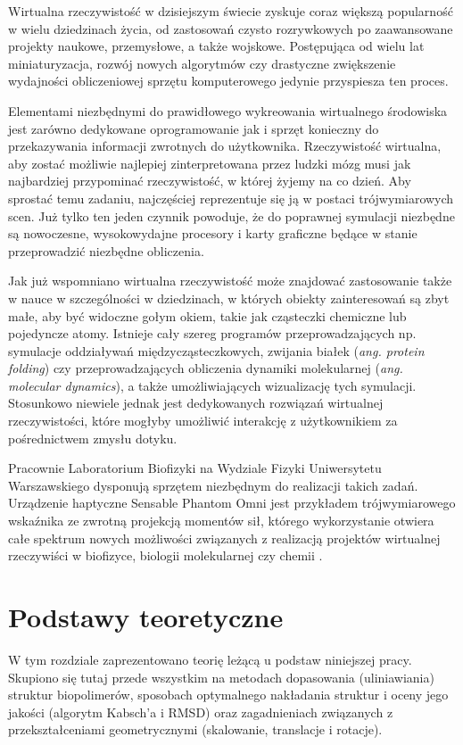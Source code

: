 \documentclass[licencjacka]{pracamgr}
\begin{document}
Wirtualna rzeczywistość w dzisiejszym świecie zyskuje coraz większą popularność w wielu dziedzinach życia, od zastosowań czysto rozrywkowych po zaawansowane projekty naukowe, przemysłowe, a także wojskowe. Postępująca od wielu lat miniaturyzacja, rozwój nowych algorytmów czy drastyczne zwiększenie wydajności obliczeniowej sprzętu komputerowego jedynie przyspiesza ten proces.

Elementami niezbędnymi do prawidłowego wykreowania wirtualnego środowiska jest zarówno dedykowane oprogramowanie jak i sprzęt konieczny do przekazywania informacji zwrotnych do użytkownika. Rzeczywistość wirtualna, aby zostać możliwie najlepiej zinterpretowana przez ludzki mózg musi jak najbardziej przypominać rzeczywistość, w której żyjemy na co dzień. Aby sprostać temu zadaniu, najczęściej reprezentuje się ją w postaci trójwymiarowych scen. Już tylko ten jeden czynnik powoduje, że do poprawnej symulacji niezbędne są nowoczesne, wysokowydajne procesory i karty graficzne będące w stanie przeprowadzić niezbędne obliczenia.

Jak już wspomniano wirtualna rzeczywistość może znajdować zastosowanie także w nauce w szczególności w dziedzinach, w których obiekty zainteresowań są zbyt małe, aby być widoczne gołym okiem, takie jak cząsteczki chemiczne lub pojedyncze atomy. Istnieje cały szereg programów przeprowadzających np. symulacje oddziaływań międzycząsteczkowych, zwijania białek (\textit{ang. protein folding}) czy przeprowadzających obliczenia dynamiki molekularnej (\textit{ang. molecular dynamics}), a także umożliwiających wizualizację tych symulacji. Stosunkowo niewiele jednak jest dedykowanych rozwiązań wirtualnej rzeczywistości, które mogłyby umożliwić interakcję z użytkownikiem za pośrednictwem zmysłu dotyku. 
	
Pracownie Laboratorium Biofizyki na Wydziale Fizyki Uniwersytetu Warszawskiego dysponują sprzętem niezbędnym do realizacji takich zadań. Urządzenie haptyczne Sensable Phantom Omni jest przykładem trójwymiarowego wskaźnika ze zwrotną projekcją momentów sił, którego wykorzystanie otwiera całe spektrum nowych możliwości związanych z realizacją projektów wirtualnej rzeczywiści w biofizyce, biologii molekularnej czy chemii  \cite{vrLecture2011}. 

\chapter{Podstawy teoretyczne}
W tym rozdziale zaprezentowano teorię leżącą u podstaw niniejszej pracy. Skupiono się tutaj przede wszystkim na metodach dopasowania (uliniawiania) struktur biopolimerów, sposobach optymalnego nakładania struktur i oceny jego jakości (algorytm Kabsch'a i RMSD) oraz zagadnieniach związanych z przekształceniami geometrycznymi (skalowanie, translacje i rotacje).
\end{document}
